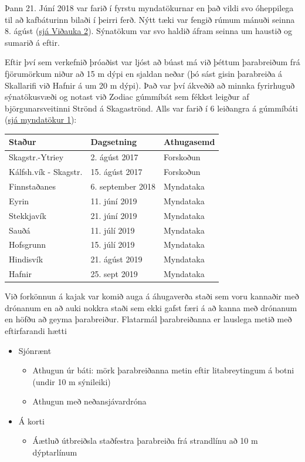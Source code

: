 \documentclass[icelandic,]{book}
\providecommand{\tightlist}{%
  \setlength{\itemsep}{0pt}\setlength{\parskip}{0pt}}
\begin{document}
Þann 21. Júní 2018 var farið í fyrstu myndatökurnar en það vildi svo óheppilega til að kafbáturinn bilaði í þeirri ferð. Nýtt tæki var fengið rúmum mánuði seinna 8. ágúst (\protect\hyperlink{v2}{sjá Viðauka 2}). Sýnatökum var svo haldið áfram seinna um haustið og sumarið á eftir.

Eftir því sem verkefnið þróaðist var ljóst að búast má við þéttum þarabreiðum frá fjörumörkum niður að 15 m dýpi en sjaldan neðar (þó sást gisin þarabreiða á Skallarifi við Hafnir á um 20 m dýpi). Það var því ákveðið að minnka fyrirhuguð sýnatökusvæði og notast við Zodiac gúmmíbát sem fékkst leigður af björgunarsveitinni Strönd á Skagaströnd. Alls var farið í 6 leiðangra á gúmmíbáti (\protect\hyperlink{results}{sjá myndatökur 1}):

\begin{longtable}[]{@{}lll@{}}
\toprule
Staður & Dagsetning & Athugasemd\tabularnewline
\midrule
\endhead
Skagstr.-Ytriey & 2. ágúst 2017 & Forskoðun\tabularnewline
Kálfsh.vík - Skagstr. & 15. ágúst 2017 & Forskoðun\tabularnewline
Finnstaðanes & 6. september 2018 & Myndataka\tabularnewline
Eyrin & 11. júní 2019 & Myndataka\tabularnewline
Stekkjavík & 21. júní 2019 & Myndataka\tabularnewline
Sauðá & 11. júlí 2019 & Myndataka\tabularnewline
Hofsgrunn & 15. júlí 2019 & Myndataka\tabularnewline
Hindisvík & 21. ágúst 2019 & Myndataka\tabularnewline
Hafnir & 25. sept 2019 & Myndataka\tabularnewline
\bottomrule
\end{longtable}

Við forkönnun á kajak var komið auga á áhugaverða staði sem voru kannaðir með drónanum en að auki nokkra staði sem ekki gafst færi á að kanna með drónanum en höfðu að geyma þarabreiður. Flatarmál þarabreiðanna er lauslega metið með eftirfarandi hætti

\begin{itemize}
\tightlist
\item
  Sjónrænt

  \begin{itemize}
  \tightlist
  \item
    Athugun úr báti: mörk þarabreiðanna metin eftir litabreytingum á botni (undir 10 m sýnileiki)
  \item
    Athugun með neðansjávardróna
  \end{itemize}
\item
  Á korti

  \begin{itemize}
  \tightlist
  \item
    Áætluð útbreiðsla staðfestra þarabreiða frá strandlínu að 10 m dýptarlínum
  \end{itemize}
\end{itemize}
\end{document}
